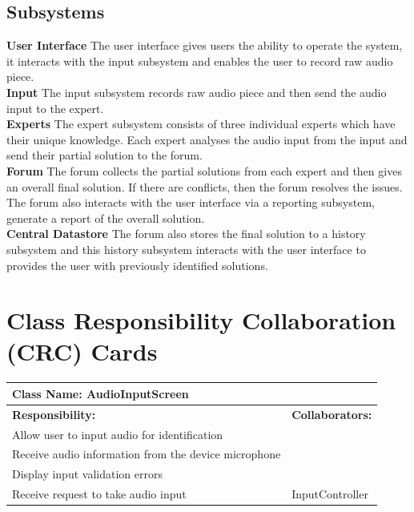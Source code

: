 \documentclass[]{article}
\begin{document}
\subsection{Subsystems}
\label{sub:subsystems}
\textbf{User Interface}
The user interface gives users the ability to operate the system, it interacts with the input subsystem and enables the user to record raw audio piece.\\
\textbf{Input} The input subsystem records raw audio piece and then send the audio input to the expert. \\
\textbf{Experts} The expert subsystem consists of three individual experts which have their unique knowledge. Each expert analyses the audio input from the input and send their partial solution to the forum. \\
\textbf{Forum} The forum collects the partial solutions from each expert and then gives an overall final solution. If there are conflicts, then the forum resolves the issues. The forum also interacts with the user interface via a reporting subsystem, generate a report of the overall solution. \\
\textbf{Central Datastore} The forum also stores the final solution to a history subsystem and this history subsystem interacts with the user interface to provides the user with previously identified solutions.\\


\newpage	
\section{Class Responsibility Collaboration (CRC) Cards}
\label{sec:class_responsibility_collaboration_crc_cards}

	
	\begin{table}[ht]
		\centering
		\begin{tabular}{|p{5cm}|p{5cm}|}
		\hline 
		 \multicolumn{2}{|l|}{\textbf{Class Name: AudioInputScreen}} \\
		\hline
		\textbf{Responsibility:} & \textbf{Collaborators:} \\
		\hline
		Allow user to input audio for identification &  \\
		\hline
		Receive audio information from the device microphone &  \\
		\hline
		Display input validation errors &  \\
		\hline
		Receive request to take audio input & InputController \\
		\hline
		\end{tabular}
	\end{table}
	
\end{document}
